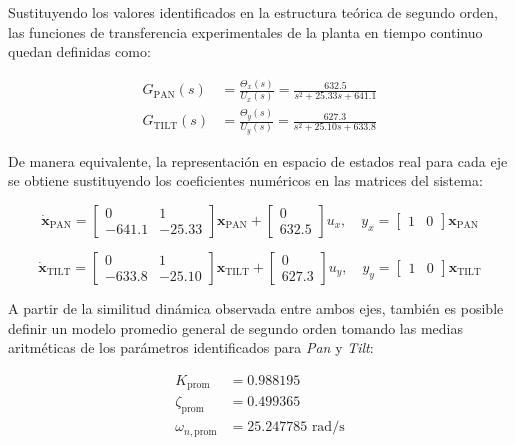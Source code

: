 \documentclass[12pt,a4paper]{article}
\begin{document}
Sustituyendo los valores identificados en la estructura teórica de segundo orden, las funciones de transferencia experimentales de la planta en tiempo continuo quedan definidas como:

\begin{align}
G_{\text{PAN}}(s) &= \frac{\Theta_x(s)}{U_x(s)} = \frac{632.5}{s^2 + 25.33s + 641.1} \\
G_{\text{TILT}}(s) &= \frac{\Theta_y(s)}{U_y(s)} = \frac{627.3}{s^2 + 25.10s + 633.8}
\end{align}

De manera equivalente, la representación en espacio de estados real para cada eje se obtiene sustituyendo los coeficientes numéricos en las matrices del sistema:

\begin{equation}
\dot{\mathbf{x}}_{\text{PAN}} = \begin{bmatrix} 0 & 1 \\ -641.1 & -25.33 \end{bmatrix} \mathbf{x}_{\text{PAN}} + \begin{bmatrix} 0 \\ 632.5 \end{bmatrix} u_x, \quad y_x = \begin{bmatrix} 1 & 0 \end{bmatrix} \mathbf{x}_{\text{PAN}}
\end{equation}

\begin{equation}
\dot{\mathbf{x}}_{\text{TILT}} = \begin{bmatrix} 0 & 1 \\ -633.8 & -25.10 \end{bmatrix} \mathbf{x}_{\text{TILT}} + \begin{bmatrix} 0 \\ 627.3 \end{bmatrix} u_y, \quad y_y = \begin{bmatrix} 1 & 0 \end{bmatrix} \mathbf{x}_{\text{TILT}}
\end{equation}

A partir de la similitud dinámica observada entre ambos ejes, también es posible definir un modelo promedio general de segundo orden tomando las medias aritméticas de los parámetros identificados para \emph{Pan} y \emph{Tilt}:

\begin{align}
K_{\text{prom}} &= 0.988195 \\
\zeta_{\text{prom}} &= 0.499365 \\
\omega_{n,\text{prom}} &= 25.247785\text{ rad/s}
\end{align}
\end{document}
